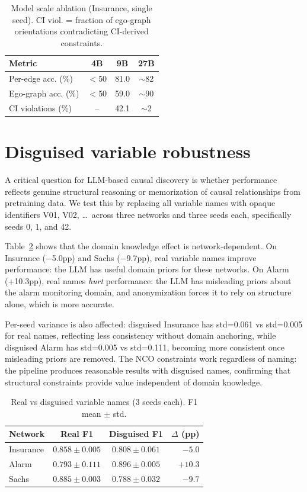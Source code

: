 \documentclass{article} %
\begin{document}
\begin{table}[h]
\centering
\caption{Model scale ablation (Insurance, single seed). CI viol. = fraction of ego-graph orientations contradicting CI-derived constraints.}
\small
\begin{tabular}{lccc}
\toprule
Metric & 4B & 9B & 27B \\
\midrule
Per-edge acc. (\%) & $<$50 & 81.0 & $\sim$82 \\
Ego-graph acc. (\%) & $<$50 & 59.0 & $\sim$90 \\
CI violations (\%) & -- & 42.1 & $\sim$2 \\
\bottomrule
\end{tabular}
\label{tab:scale}
\end{table}


\section{Disguised variable robustness}
\label{app:disguised}

A critical question for LLM-based causal discovery is whether performance reflects genuine structural reasoning or memorization of causal relationships from pretraining data. We test this by replacing all variable names with opaque identifiers V01, V02, \ldots\ across three networks and three seeds each, specifically seeds 0, 1, and 42.

Table~\ref{tab:disguised} shows that the domain knowledge effect is network-dependent. On Insurance ($-$5.0pp) and Sachs ($-$9.7pp), real variable names improve performance: the LLM has useful domain priors for these networks. On Alarm (+10.3pp), real names \textit{hurt} performance: the LLM has misleading priors about the alarm monitoring domain, and anonymization forces it to rely on structure alone, which is more accurate.

Per-seed variance is also affected: disguised Insurance has std=0.061 vs std=0.005 for real names, reflecting less consistency without domain anchoring, while disguised Alarm has std=0.005 vs std=0.111, becoming more consistent once misleading priors are removed. The NCO constraints work regardless of naming: the pipeline produces reasonable results with disguised names, confirming that structural constraints provide value independent of domain knowledge.

\begin{table}[h]
\centering
\caption{Real vs disguised variable names (3 seeds each). F1 mean $\pm$ std.}
\small
\begin{tabular}{lccr}
\toprule
Network & Real F1 & Disguised F1 & $\Delta$ (pp) \\
\midrule
Insurance & $0.858 \pm 0.005$ & $0.808 \pm 0.061$ & $-5.0$ \\
Alarm     & $0.793 \pm 0.111$ & $0.896 \pm 0.005$ & $+10.3$ \\
Sachs     & $0.885 \pm 0.003$ & $0.788 \pm 0.032$ & $-9.7$ \\
\bottomrule
\end{tabular}
\label{tab:disguised}
\end{table}
\end{document}
